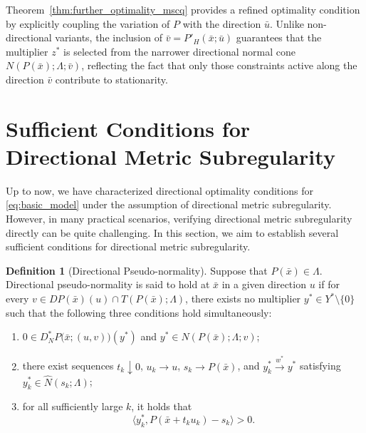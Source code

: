 \documentclass[12pt,twoside,reqno]{amsart}
\theoremstyle{definition}
\newtheorem{definition}[theorem]{Definition}
\numberwithin{equation}{section}
\begin{document}
Theorem~\ref{thm:further_optimality_mscq} provides a refined optimality condition by explicitly coupling the variation of $P$ with the direction $\bar{u}$. Unlike non-directional variants, the inclusion of $\bar{v} = P'_H(\bar{x}; \bar{u})$ guarantees that the multiplier $z^*$ is selected from the narrower directional normal cone $N(P(\bar{x}); \Lambda; \bar{v})$, reflecting the fact that only those constraints active along the direction $\bar{v}$ contribute to stationarity.

\section{Sufficient Conditions for Directional Metric Subregularity} \label{sec:sufficient_condition_for_mscq}

Up to now, we have characterized directional optimality conditions for \eqref{eq:basic_model} under the assumption of directional metric subregularity. However, in many practical scenarios, verifying directional metric subregularity directly can be quite challenging. In this section, we aim to establish several sufficient conditions for directional metric subregularity. 

\begin{definition}[Directional Pseudo-normality] \label{defn:directional_pseudo_normality} 
    Suppose that $P(\bar{x}) \in \Lambda$. Directional pseudo-normality is said to hold at $\bar{x}$ in a given direction $u$ if for every $v \in DP(\bar{x})(u) \cap T(P(\bar{x}); \Lambda)$,  there exists no multiplier $y^* \in Y^* \setminus \{0\}$ such that the following three conditions hold simultaneously:
    \begin{enumerate}
        \item[(i)] $0 \in D_N^* P\big(\bar{x}; (u,v)\big)(y^*)$ and $y^* \in N(P(\bar{x}); \Lambda; v)$;
        \item[(ii)] there exist sequences $t_k \downarrow 0$, $u_k \to u$, $s_k \to P(\bar{x})$, and $y_k^* \xrightarrow{w^*} y^*$ satisfying $y_k^* \in \widehat{N}(s_k; \Lambda)$;
        \item[(iii)] for all sufficiently large $k$, it holds that
        \begin{equation}\label{eq:directional_pseudo_normality}
            \langle y_k^*, P(\bar{x} + t_k u_k) - s_k \rangle > 0.  
        \end{equation}
    \end{enumerate}
\end{definition}
\end{document}
